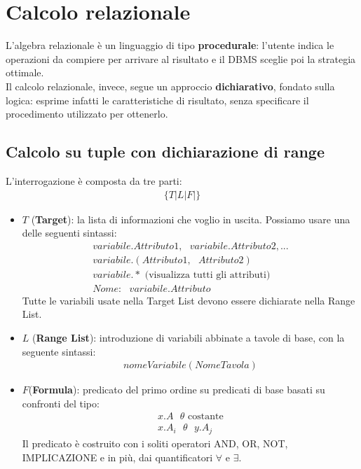 \chapter{Calcolo relazionale}

L'algebra relazionale è un linguaggio di tipo \textbf{procedurale}: l'utente indica le operazioni da compiere per arrivare al risultato e il DBMS sceglie poi la strategia ottimale.\\
Il calcolo relazionale, invece, segue un approccio \textbf{dichiarativo}, fondato sulla logica: esprime infatti le caratteristiche di risultato, senza specificare il procedimento utilizzato per ottenerlo.

\section{Calcolo su tuple con dichiarazione di range}
L'interrogazione è composta da tre parti:  
\begin{equation}\begin{aligned}
    \{  T|L|F|  \}
\end{aligned}\end{equation}
\begin{itemize}
    \item{$T$ (\textbf{Target}): la lista di informazioni che voglio in uscita. Possiamo usare una delle seguenti sintassi:
        \begin{equation}\begin{aligned}
            variabile.Attributo1,\text{ } variabile.Attributo2, ...\\
            variabile.(Attributo1,\text{ } Attributo2)\\
            variabile.* \text{ (visualizza tutti gli attributi)}\\
            Nome: \text{ } variabile.Attributo
        \end{aligned}\end{equation}
    Tutte le variabili usate nella Target List devono essere dichiarate nella Range List.}
    \item{$L$ (\textbf{Range List}): introduzione di variabili abbinate a tavole di base, con la seguente sintassi:
        \begin{equation}\begin{aligned}
            nomeVariabile (NomeTavola)
        \end{aligned}\end{equation}}
    \item{$F$(\textbf{Formula}): predicato del primo ordine su predicati di base basati su confronti del tipo:
        \begin{equation}\begin{aligned}
            x.A \text{ }\theta \text{ costante}\\
            x.A_i \text{ }\theta \text{ }y.A_j
        \end{aligned}\end{equation}
    Il predicato è costruito con i soliti operatori AND, OR, NOT, IMPLICAZIONE e in più, dai quantificatori $\forall$ e $\exists$.}
    \end{itemize}

